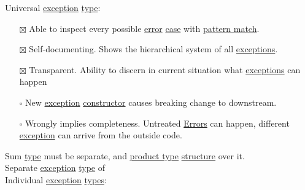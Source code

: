 \documentclass[a4paper,14pt,oneside]{book}
\begin{document}
Universal \hyperref[org4a5dbbf]{exception} \hyperref[orga286a54]{type}:\\

\begin{itemize}
\item[{$\boxtimes$}] Able to inspect every possible \hyperref[org7949068]{error} \hyperref[org3474b97]{case} with \hyperref[orgef9dab6]{pattern match}.\\
\item[{$\boxtimes$}] Self-documenting. Shows the hierarchical system of all \hyperref[org21526fc]{exceptions}.\\
\item[{$\boxtimes$}] Transparent. Ability to discern in current situation what \hyperref[org21526fc]{exceptions} can happen\\
\item[{$\square$}] New \hyperref[org4a5dbbf]{exception} \hyperref[org43f0267]{constructor} causes breaking change to downstream.\\
\item[{$\square$}] Wrongly implies completeness. Untreated \hyperref[orge2e4688]{Errors} can happen, different \hyperref[org4a5dbbf]{exception} can arrive from the outside code.\\
\end{itemize}

Sum \hyperref[orga286a54]{type} must be separate, and \hyperref[org8b539ba]{product type} \hyperref[org6446676]{structure} over it.\\
Separate \hyperref[org4a5dbbf]{exception} \hyperref[orga286a54]{type} of\\

Individual \hyperref[org4a5dbbf]{exception} \hyperref[orga478d03]{types}:\\
\end{document}
